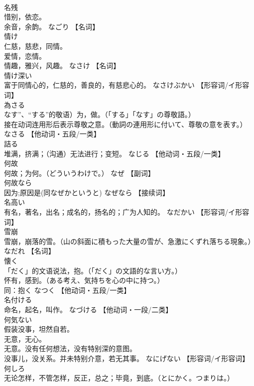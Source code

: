 \documentclass[8pt]{extreport}
\begin{document}
\begin{CJK}{UTF8}{min}
\\	名残	
\\	惜别，依恋。 
\\	余音，余韵。	なごり		【名词】
\\	情け	
\\	仁慈，慈悲，同情。 
\\	爱情，恋情。 
\\	情趣，雅兴，风趣。	なさけ		【名词】
\\	情け深い	
\\	富于同情心的，仁慈的，善良的，有慈悲心的。	なさけぶかい		【形容词/イ形容词】
\\	為さる	
\\	なす”、“する”的敬语）为，做。（「する」「なす」の尊敬語。） 
\\	接在动词连用形后表示尊敬之意。（動詞の連用形に付いて、尊敬の意を表す。）	なさる		【他动词・五段/一类】
\\	詰る	
\\	堆满，挤满；（沟通）无法进行；变短。	なじる		【他动词・五段/一类】
\\	何故	
\\	何故；为何。（どういうわけで。）	なぜ		【副词】
\\	何故なら	
\\	因为;原因是(同なぜかというと)	なぜなら		【接续词】
\\	名高い	
\\	有名，著名，出名；成名的，扬名的；广为人知的。	なだかい		【形容词/イ形容词】
\\	雪崩	
\\	雪崩，崩落的雪。（山の斜面に積もった大量の雪が、急激にくずれ落ちる現象。）	なだれ		【名词】
\\	懐く	
\\	「だく」的文语说法，抱。（「だく」の文語的な言い方。） 
\\	怀有，感到。（ある考え、気持ちを心の中に持つ。） 
\\	同：抱く	なつく		【他动词・五段/一类】
\\	名付ける	
\\	命名，起名，叫作。	なづける		【他动词・一段/二类】
\\	何気ない	
\\	假装没事，坦然自若。 
\\	无意，无心。 
\\	无意。没有任何想法，没有特别深的意图。 
\\	没事儿，没关系。并未特别介意，若无其事。	なにげない		【形容词/イ形容词】
\\	何しろ	
\\	无论怎样，不管怎样，反正，总之；毕竟，到底。（とにかく。つまりは。） 

\end{CJK}
\end{document}
